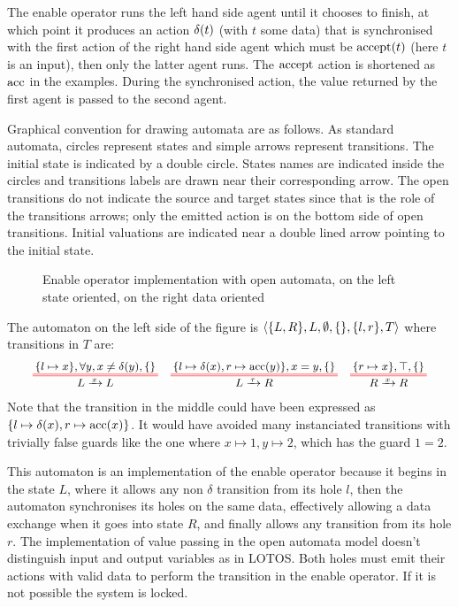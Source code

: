 \documentclass{article}
\begin{document}
The enable operator runs the left hand side agent until it chooses to finish, at which point it produces an action \(\delta{\left(t\right)}\) (with \(t\) some data) that is synchronised with the first action of the right hand side agent which must be \(\mathrm{accept}{\left(t\right)}\) (here \(t\) is an input), then only the latter agent runs.
The \(\mathrm{accept}\) action is shortened as \(\mathrm{acc}\) in the examples.
During the synchronised action, the value returned by the first agent is passed to the second agent.
\begin{exi}
Graphical convention for drawing automata are as follows.
As standard automata, circles represent states and simple arrows represent transitions.
The initial state is indicated by a double circle.
States names are indicated inside the circles and transitions labels are drawn near their corresponding arrow.
The open transitions do not indicate the source and target states since that is the role of the transitions arrows; only the emitted action is on the bottom side of open transitions.
Initial valuations are indicated near a double lined arrow pointing to the initial state.
\begin{figure}
\centering

\vrule

\caption{Enable operator implementation with open automata, on the left state oriented, on the right data oriented}
\label{fig:enable}
\end{figure}
The automaton on the left side of the figure is \(\left<{\left\{L, R\right\}},L,\emptyset,{\left\{\right\}},{\left\{l, r\right\}},T\right>\) where transitions in \(T\) are:
\begin{align*}
	\OT{L}{L}{x}{\mbrc{l \mapsto x}}{\forall y, x \neq \delta\mpar{y}}{\mbrc{}} &&
	\OT{L}{R}{\tau}{\mbrc{l \mapsto \delta\mpar{x}, r \mapsto \act{acc}\mpar{y}}}{x = y}{\mbrc{}} &&
	\OT{R}{R}{x}{\mbrc{r \mapsto x}}{\top}{\mbrc{}}
\end{align*}
Note that the transition in the middle could have been expressed as \({\left\{l \mapsto \delta{\left(x\right)}, r \mapsto \mathrm{acc}{\left(x\right)}\right\}}\).
It would have avoided many instanciated transitions with trivially false guards like the one where \(x \mapsto 1, y \mapsto 2\), which has the guard \(1 = 2\).

This automaton is an implementation of the enable operator because it begins in the state \(L\), where it allows any non \(\delta\) transition from its hole \(l\), then the automaton synchronises its holes on the same data, effectively allowing a data exchange when it goes into state \(R\), and finally allows any transition from its hole \(r\).
The implementation of value passing in the open automata model doesn't distinguish input and output variables as in LOTOS.
Both holes must emit their actions with valid data to perform the transition in the enable operator.
If it is not possible the system is locked.


\end{exi}
\end{document}
